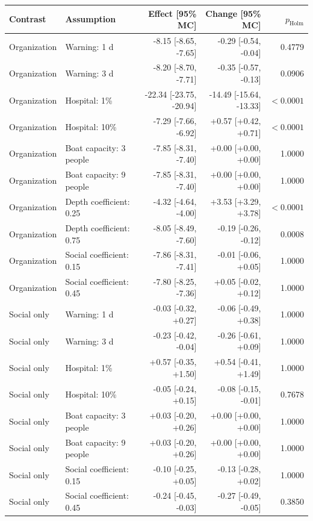 \begin{tabular}{llrrr}
\toprule
Contrast & Assumption & Effect [95\% MC] & Change [95\% MC] & $p_{\mathrm{Holm}}$ \\
\midrule
Organization & Warning: 1 d & -8.15 [-8.65, -7.65] & -0.29 [-0.54, -0.04] & 0.4779 \\
Organization & Warning: 3 d & -8.20 [-8.70, -7.71] & -0.35 [-0.57, -0.13] & 0.0906 \\
Organization & Hospital: 1\% & -22.34 [-23.75, -20.94] & -14.49 [-15.64, -13.33] & $<0.0001$ \\
Organization & Hospital: 10\% & -7.29 [-7.66, -6.92] & +0.57 [+0.42, +0.71] & $<0.0001$ \\
Organization & Boat capacity: 3 people & -7.85 [-8.31, -7.40] & +0.00 [+0.00, +0.00] & 1.0000 \\
Organization & Boat capacity: 9 people & -7.85 [-8.31, -7.40] & +0.00 [+0.00, +0.00] & 1.0000 \\
Organization & Depth coefficient: 0.25 & -4.32 [-4.64, -4.00] & +3.53 [+3.29, +3.78] & $<0.0001$ \\
Organization & Depth coefficient: 0.75 & -8.05 [-8.49, -7.60] & -0.19 [-0.26, -0.12] & 0.0008 \\
Organization & Social coefficient: 0.15 & -7.86 [-8.31, -7.41] & -0.01 [-0.06, +0.05] & 1.0000 \\
Organization & Social coefficient: 0.45 & -7.80 [-8.25, -7.36] & +0.05 [-0.02, +0.12] & 1.0000 \\
Social only & Warning: 1 d & -0.03 [-0.32, +0.27] & -0.06 [-0.49, +0.38] & 1.0000 \\
Social only & Warning: 3 d & -0.23 [-0.42, -0.04] & -0.26 [-0.61, +0.09] & 1.0000 \\
Social only & Hospital: 1\% & +0.57 [-0.35, +1.50] & +0.54 [-0.41, +1.49] & 1.0000 \\
Social only & Hospital: 10\% & -0.05 [-0.24, +0.15] & -0.08 [-0.15, -0.01] & 0.7678 \\
Social only & Boat capacity: 3 people & +0.03 [-0.20, +0.26] & +0.00 [+0.00, +0.00] & 1.0000 \\
Social only & Boat capacity: 9 people & +0.03 [-0.20, +0.26] & +0.00 [+0.00, +0.00] & 1.0000 \\
Social only & Social coefficient: 0.15 & -0.10 [-0.25, +0.05] & -0.13 [-0.28, +0.02] & 1.0000 \\
Social only & Social coefficient: 0.45 & -0.24 [-0.45, -0.03] & -0.27 [-0.49, -0.05] & 0.3850 \\

\end{tabular}
